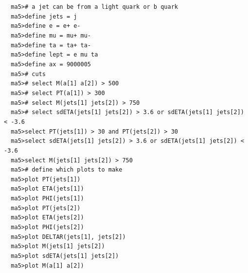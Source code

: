 \documentclass[a4paper, 10pt]{article}
\begin{document}
\texttt{ }\texttt{ }\texttt{ma5>\# a jet can be from a light quark or b quark\\
}
\texttt{ }\texttt{ }\texttt{ma5>define jets = j\\
}
\texttt{ }\texttt{ }\texttt{ma5>define e = e+ e-\\
}
\texttt{ }\texttt{ }\texttt{ma5>define mu = mu+ mu-\\
}
\texttt{ }\texttt{ }\texttt{ma5>define ta = ta+ ta-\\
}
\texttt{ }\texttt{ }\texttt{ma5>define lept = e mu ta\\
}
\texttt{ }\texttt{ }\texttt{ma5>define ax = 9000005\\
}
\texttt{ }\texttt{ }\texttt{ma5>\# cuts\\
}
\texttt{ }\texttt{ }\texttt{ma5>\# select M(a[1] a[2]) > 500\\
}
\texttt{ }\texttt{ }\texttt{ma5>\# select PT(a[1]) > 300\\
}
\texttt{ }\texttt{ }\texttt{ma5>\# select M(jets[1] jets[2]) > 750\\
}
\texttt{ }\texttt{ }\texttt{ma5>\# select sdETA(jets[1] jets[2]) > 3.6 or sdETA(jets[1] jets[2]) < -3.6\\
}
\texttt{ }\texttt{ }\texttt{ma5>select PT(jets[1]) > 30 and PT(jets[2]) > 30\\
}
\texttt{ }\texttt{ }\texttt{ma5>select sdETA(jets[1] jets[2]) > 3.6 or sdETA(jets[1] jets[2]) < -3.6\\
}
\texttt{ }\texttt{ }\texttt{ma5>select M(jets[1] jets[2]) > 750\\
}
\texttt{ }\texttt{ }\texttt{ma5>\# define which plots to make\\
}
\texttt{ }\texttt{ }\texttt{ma5>plot PT(jets[1])\\
}
\texttt{ }\texttt{ }\texttt{ma5>plot ETA(jets[1])\\
}
\texttt{ }\texttt{ }\texttt{ma5>plot PHI(jets[1])\\
}
\texttt{ }\texttt{ }\texttt{ma5>plot PT(jets[2])\\
}
\texttt{ }\texttt{ }\texttt{ma5>plot ETA(jets[2])\\
}
\texttt{ }\texttt{ }\texttt{ma5>plot PHI(jets[2])\\
}
\texttt{ }\texttt{ }\texttt{ma5>plot DELTAR(jets[1], jets[2])\\
}
\texttt{ }\texttt{ }\texttt{ma5>plot M(jets[1] jets[2])\\
}
\texttt{ }\texttt{ }\texttt{ma5>plot sdETA(jets[1] jets[2])\\
}
\texttt{ }\texttt{ }\texttt{ma5>plot M(a[1] a[2])\\
}
\end{document}
